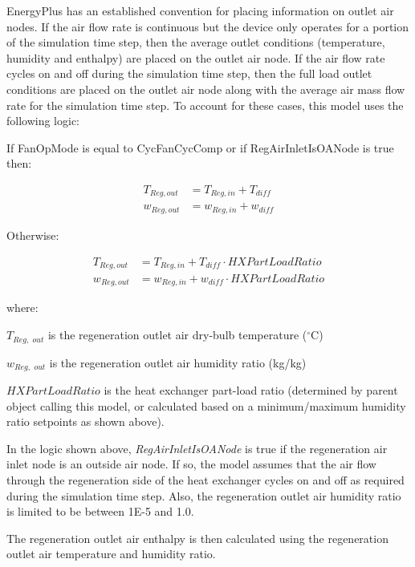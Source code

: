 EnergyPlus has an established convention for placing information on outlet air nodes. If the air flow rate is continuous but the device only operates for a portion of the simulation time step, then the average outlet conditions (temperature, humidity and enthalpy) are placed on the outlet air node. If the air flow rate cycles on and off during the simulation time step, then the full load outlet conditions are placed on the outlet air node along with the average air mass flow rate for the simulation time step. To account for these cases, this model uses the following logic:

If FanOpMode is equal to CycFanCycComp or if RegAirInletIsOANode is true then:

\begin{equation}
  \begin{array}{rl}
    T_{Reg,out} &= T_{Reg,in} + T_{diff} \\
    w_{Reg,out} &= w_{Reg,in} + w_{diff}
  \end{array}
\end{equation}

Otherwise:

\begin{equation}
  \begin{array}{rl}
    T_{Reg,out} &= T_{Reg,in} + T_{diff} \cdot HXPartLoadRatio \\
    w_{Reg,out} &= w_{Reg,in} + w_{diff} \cdot HXPartLoadRatio 
  \end{array}
\end{equation}

where:

\({T_{Reg,\,\,out}}\) is the regeneration outlet air dry-bulb temperature (\(^{\circ}\)C)

\({w_{Reg,\,\,out}}\) is the regeneration outlet air humidity ratio (kg/kg)

\(HXPartLoadRatio\) is the heat exchanger part-load ratio (determined by parent object calling this model, or calculated based on a minimum/maximum humidity ratio setpoints as shown above).

In the logic shown above, \emph{RegAirInletIsOANode} is true if the regeneration air inlet node is an outside air node. If so, the model assumes that the air flow through the regeneration side of the heat exchanger cycles on and off as required during the simulation time step. Also, the regeneration outlet air humidity ratio is limited to be between 1E-5 and 1.0.

The regeneration outlet air enthalpy is then calculated using the regeneration outlet air temperature and humidity ratio.

